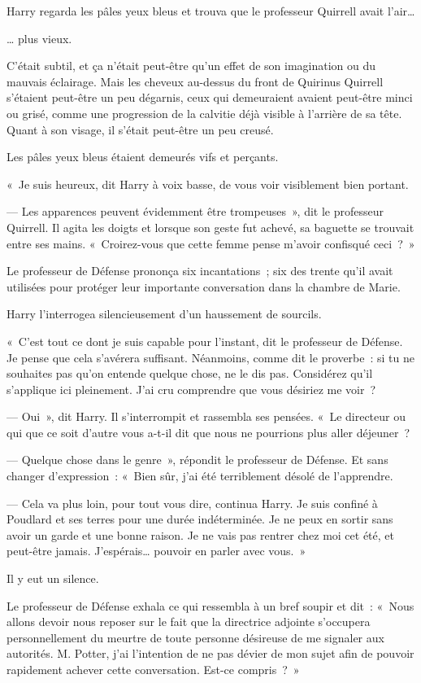 Harry regarda les pâles yeux bleus et trouva que le professeur Quirrell avait l'air…

… plus vieux.

C'était subtil, et ça n'était peut-être qu'un effet de son imagination ou du mauvais éclairage.
Mais les cheveux au-dessus du front de Quirinus Quirrell s'étaient peut-être un peu dégarnis, ceux qui demeuraient avaient peut-être minci ou grisé, comme une progression de la calvitie déjà visible à l'arrière de sa tête.
Quant à son visage, il s'était peut-être un peu creusé.

Les pâles yeux bleus étaient demeurés vifs et perçants.

«~Je suis heureux, dit Harry à voix basse, de vous voir visiblement bien portant.

--- Les apparences peuvent évidemment être trompeuses~», dit le professeur Quirrell.
Il agita les doigts et lorsque son geste fut achevé, sa baguette se trouvait entre ses mains.
«~Croirez-vous que cette femme pense m'avoir confisqué ceci~?~»

Le professeur de Défense prononça six incantations~; six des trente qu'il avait utilisées pour protéger leur importante conversation dans la chambre de Marie.

Harry l'interrogea silencieusement d'un haussement de sourcils.

«~C'est tout ce dont je suis capable pour l'instant, dit le professeur de Défense.
Je pense que cela s'avérera suffisant.
Néanmoins, comme dit le proverbe~: si tu ne souhaites pas qu'on entende quelque chose, ne le dis pas.
Considérez qu'il s'applique ici pleinement.
J'ai cru comprendre que vous désiriez me voir~?

--- Oui~», dit Harry.
Il s'interrompit et rassembla ses pensées.
«~Le directeur ou qui que ce soit d'autre vous a-t-il dit que nous ne pourrions plus aller déjeuner~?

--- Quelque chose dans le genre~», répondit le professeur de Défense.
Et sans changer d'expression~: «~Bien sûr, j'ai été terriblement désolé de l'apprendre.

--- Cela va plus loin, pour tout vous dire, continua Harry.
Je suis confiné à Poudlard et ses terres pour une durée indéterminée.
Je ne peux en sortir sans avoir un garde et une bonne raison.
Je ne vais pas rentrer chez moi cet été, et peut-être jamais.
J'espérais… pouvoir en parler avec vous.~»

Il y eut un silence.

Le professeur de Défense exhala ce qui ressembla à un bref soupir et dit~: «~Nous allons devoir nous reposer sur le fait que la directrice adjointe s'occupera personnellement du meurtre de toute personne désireuse de me signaler aux autorités.
M. Potter, j'ai l'intention de ne pas dévier de mon sujet afin de pouvoir rapidement achever cette conversation.
Est-ce compris~?~»


